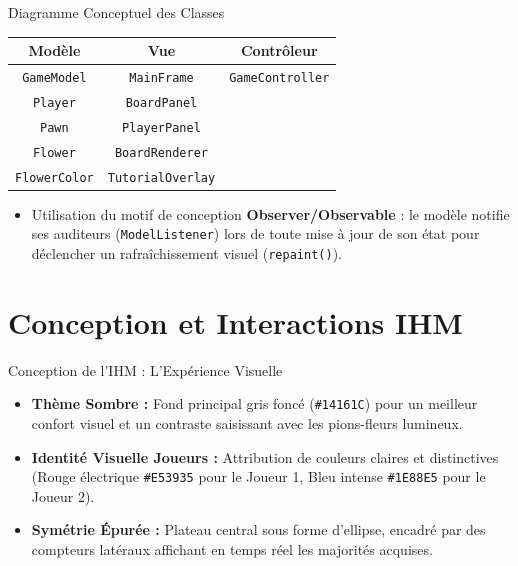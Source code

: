 \documentclass{beamer}
\begin{document}
\begin{frame}{Diagramme Conceptuel des Classes}
    \begin{center}
        \begin{tabular}{ccc}
            \toprule
            \textbf{Modèle} & \textbf{Vue} & \textbf{Contrôleur} \\
            \midrule
            \texttt{GameModel} & \texttt{MainFrame} & \texttt{GameController} \\
            \texttt{Player} & \texttt{BoardPanel} & \\
            \texttt{Pawn} & \texttt{PlayerPanel} & \\
            \texttt{Flower} & \texttt{BoardRenderer} & \\
            \texttt{FlowerColor} & \texttt{TutorialOverlay} & \\
            \bottomrule
        \end{tabular}
    \end{center}
    \begin{itemize}
        \item Utilisation du motif de conception \textbf{Observer/Observable} : le modèle notifie ses auditeurs (\texttt{ModelListener}) lors de toute mise à jour de son état pour déclencher un rafraîchissement visuel (\texttt{repaint()}).
    \end{itemize}
\end{frame}

\section{Conception et Interactions IHM}

\begin{frame}{Conception de l'IHM : L'Expérience Visuelle}
    \begin{itemize}
        \item \textbf{Thème Sombre :} Fond principal gris foncé (\texttt{\#14161C}) pour un meilleur confort visuel et un contraste saisissant avec les pions-fleurs lumineux.
        \item \textbf{Identité Visuelle Joueurs :} Attribution de couleurs claires et distinctives (Rouge électrique \texttt{\#E53935} pour le Joueur 1, Bleu intense \texttt{\#1E88E5} pour le Joueur 2).
        \item \textbf{Symétrie Épurée :} Plateau central sous forme d'ellipse, encadré par des compteurs latéraux affichant en temps réel les majorités acquises.
    \end{itemize}
\end{frame}
\end{document}
